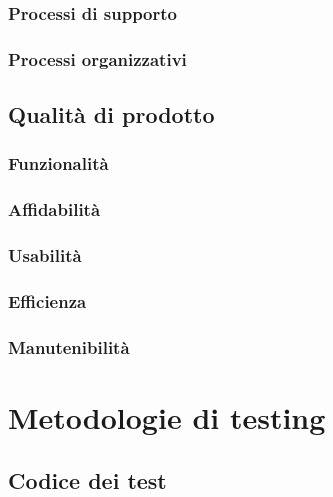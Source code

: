 \documentclass[italian,12pt]{article} %
\begin{document}

\subsubsection{Processi di supporto}




\subsubsection{Processi organizzativi}


\subsection{Qualità di prodotto}

\subsubsection{Funzionalità}

\subsubsection{Affidabilità}

\subsubsection{Usabilità}

\subsubsection{Efficienza}

\subsubsection{Manutenibilità}

\section{Metodologie di testing}

\subsection{Codice dei test}
\end{document}
